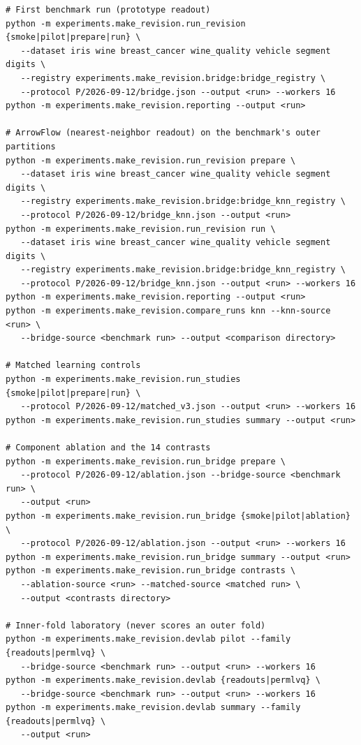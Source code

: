 \begin{scriptsize}
\begin{verbatim}
# First benchmark run (prototype readout)
python -m experiments.make_revision.run_revision {smoke|pilot|prepare|run} \
   --dataset iris wine breast_cancer wine_quality vehicle segment digits \
   --registry experiments.make_revision.bridge:bridge_registry \
   --protocol P/2026-09-12/bridge.json --output <run> --workers 16
python -m experiments.make_revision.reporting --output <run>

# ArrowFlow (nearest-neighbor readout) on the benchmark's outer partitions
python -m experiments.make_revision.run_revision prepare \
   --dataset iris wine breast_cancer wine_quality vehicle segment digits \
   --registry experiments.make_revision.bridge:bridge_knn_registry \
   --protocol P/2026-09-12/bridge_knn.json --output <run>
python -m experiments.make_revision.run_revision run \
   --dataset iris wine breast_cancer wine_quality vehicle segment digits \
   --registry experiments.make_revision.bridge:bridge_knn_registry \
   --protocol P/2026-09-12/bridge_knn.json --output <run> --workers 16
python -m experiments.make_revision.reporting --output <run>
python -m experiments.make_revision.compare_runs knn --knn-source <run> \
   --bridge-source <benchmark run> --output <comparison directory>

# Matched learning controls
python -m experiments.make_revision.run_studies {smoke|pilot|prepare|run} \
   --protocol P/2026-09-12/matched_v3.json --output <run> --workers 16
python -m experiments.make_revision.run_studies summary --output <run>

# Component ablation and the 14 contrasts
python -m experiments.make_revision.run_bridge prepare \
   --protocol P/2026-09-12/ablation.json --bridge-source <benchmark run> \
   --output <run>
python -m experiments.make_revision.run_bridge {smoke|pilot|ablation} \
   --protocol P/2026-09-12/ablation.json --output <run> --workers 16
python -m experiments.make_revision.run_bridge summary --output <run>
python -m experiments.make_revision.run_bridge contrasts \
   --ablation-source <run> --matched-source <matched run> \
   --output <contrasts directory>

# Inner-fold laboratory (never scores an outer fold)
python -m experiments.make_revision.devlab pilot --family {readouts|permlvq} \
   --bridge-source <benchmark run> --output <run> --workers 16
python -m experiments.make_revision.devlab {readouts|permlvq} \
   --bridge-source <benchmark run> --output <run> --workers 16
python -m experiments.make_revision.devlab summary --family {readouts|permlvq} \
   --output <run>


\end{verbatim}
\end{scriptsize}
